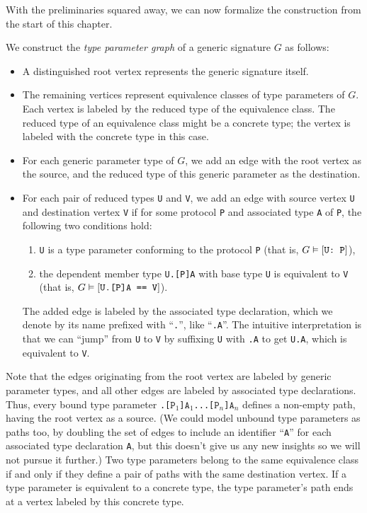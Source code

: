 \documentclass[../generics]{subfiles}
\begin{document}
\smallskip
With the preliminaries squared away, we can now formalize the construction from the start of this chapter. 
\begin{definition}
We construct the \emph{type parameter graph} of a generic signature $G$ as follows:
\begin{itemize}
\item A distinguished root vertex represents the generic signature itself.
\item The remaining vertices represent equivalence classes of type parameters of $G$. Each vertex is labeled by the reduced type of the equivalence class. The reduced type of an equivalence class might be a concrete type; the vertex is labeled with the concrete type in this case.
\item For each generic parameter type of $G$, we add an edge with the root vertex as the source, and the reduced type of this generic parameter as the destination.
\item For each pair of reduced types \texttt{U} and \texttt{V}, we add an edge with source vertex \texttt{U} and destination vertex \texttt{V} if for some protocol \texttt{P} and associated type \texttt{A} of \texttt{P}, the following two conditions hold:
\begin{enumerate}
\item \texttt{U} is a type parameter conforming to the protocol \texttt{P} (that is, $G\vDash[\texttt{U:~P}]$),
\item the dependent member type \texttt{U.[P]A} with base type \texttt{U} is equivalent to \texttt{V} (that is, $G\vDash[\texttt{U.[P]A == V}]$).
\end{enumerate}
The added edge is labeled by the associated type declaration, which we denote by its name prefixed with ``\texttt{.}'', like ``\texttt{.A}''. The intuitive interpretation is that we can ``jump'' from \texttt{U} to \texttt{V} by suffixing \texttt{U} with \texttt{.A} to get \texttt{U.A}, which is equivalent to \texttt{V}.
\end{itemize}
\end{definition}

Note that the edges originating from the root vertex are labeled by generic parameter types, and all other edges are labeled by associated type declarations. Thus, every bound type parameter \texttt{.[$\texttt{P}_1$]$\texttt{A}_1$...[$\texttt{P}_n$]$\texttt{A}_n$} defines a non-empty path, having the root vertex as a source. (We could model unbound type parameters as paths too, by doubling the set of edges to include an identifier ``\texttt{A}'' for each associated type declaration \texttt{A}, but this doesn't give us any new insights so we will not pursue it further.) Two type parameters belong to the same equivalence class if and only if they define a pair of paths with the same destination vertex. If a type parameter is equivalent to a concrete type, the type parameter's path ends at a vertex labeled by this concrete type.
\end{document}
